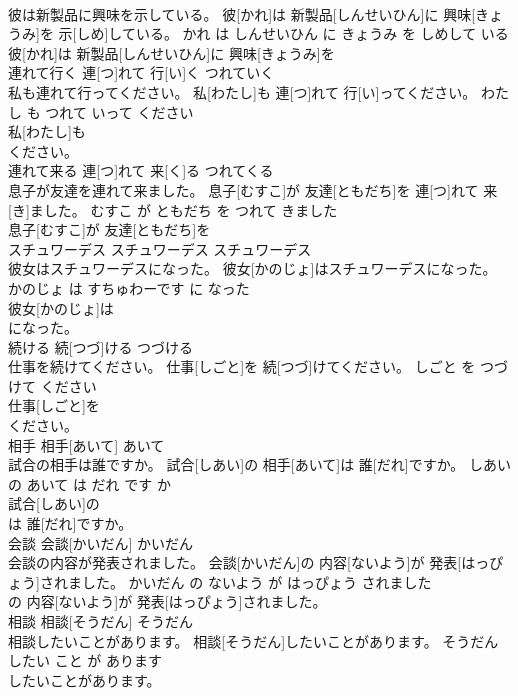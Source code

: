 \documentclass[8pt]{extreport}
\begin{document}
\begin{CJK}{UTF8}{min}
\\	彼は新製品に興味を示している。	彼[かれ]は 新製品[しんせいひん]に 興味[きょうみ]を 示[しめ]している。	かれ は しんせいひん に きょうみ を しめして いる	
\\	彼[かれ]は 新製品[しんせいひん]に 興味[きょうみ]を
\\	連れて行く	連[つ]れて 行[い]く	つれていく	
\\	私も連れて行ってください。	私[わたし]も 連[つ]れて 行[い]ってください。	わたし も つれて いって ください	
\\	私[わたし]も
\\	ください。			
\\	連れて来る	連[つ]れて 来[く]る	つれてくる	
\\	息子が友達を連れて来ました。	息子[むすこ]が 友達[ともだち]を 連[つ]れて 来[き]ました。	むすこ が ともだち を つれて きました	
\\	息子[むすこ]が 友達[ともだち]を
\\	スチュワーデス	スチュワーデス	スチュワーデス	
\\	彼女はスチュワーデスになった。	彼女[かのじょ]はスチュワーデスになった。	かのじょ は すちゅわーです に なった	
\\	彼女[かのじょ]は
\\	になった。			
\\	続ける	続[つづ]ける	つづける	
\\	仕事を続けてください。	仕事[しごと]を 続[つづ]けてください。	しごと を つづけて ください	
\\	仕事[しごと]を
\\	ください。			
\\	相手	相手[あいて]	あいて	
\\	試合の相手は誰ですか。	試合[しあい]の 相手[あいて]は 誰[だれ]ですか。	しあい の あいて は だれ です か	
\\	試合[しあい]の
\\	は 誰[だれ]ですか。			
\\	会談	会談[かいだん]	かいだん	
\\	会談の内容が発表されました。	会談[かいだん]の 内容[ないよう]が 発表[はっぴょう]されました。	かいだん の ないよう が はっぴょう されました	
\\	の 内容[ないよう]が 発表[はっぴょう]されました。			
\\	相談	相談[そうだん]	そうだん	
\\	相談したいことがあります。	相談[そうだん]したいことがあります。	そうだん したい こと が あります	
\\	したいことがあります。			

\end{CJK}
\end{document}
